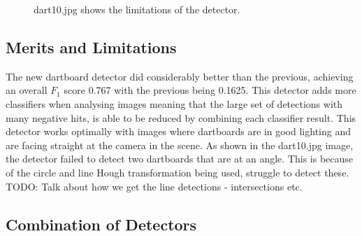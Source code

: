 \documentclass[a4paper]{article}
\begin{document}
\begin{figure}[H]
  \centering
  \hfill
   \hfill
   \hfill
   \caption{dart10.jpg shows the limitations of the detector.}
\end{figure}


\subsection*{Merits and Limitations}
\vspace{-0.7em}
The new dartboard detector did considerably better than the previous, achieving
an overall \(F_{1}\) score 0.767 with the previous being 0.1625. This detector adds more classifiers when analysing images meaning that
the large set of detections with many negative hits, is able to be reduced by
combining each classifier result. This detector works optimally with images
where dartboards are in good lighting and are facing straight at the camera in
the scene. As shown in the dart10.jpg image, the detector failed to detect two
dartboards that are at an angle. This is because of the circle and line Hough
transformation being used, struggle to detect these. TODO: Talk about how we get the line detections - intersections etc.

\subsection*{Combination of Detectors}
\begin{figure}[H]
  \centering
\end{figure}
\end{document}
